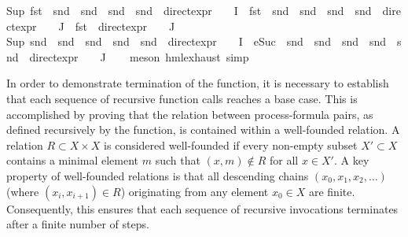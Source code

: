 \begin{isabellebody}
{\isacharparenleft}{\kern0pt}Sup\ {\isacharparenleft}{\kern0pt}{\isacharparenleft}{\kern0pt}fst\ {\isasymcirc}\ snd\ {\isasymcirc}\ snd\ {\isasymcirc}\ snd\ {\isasymcirc}\ snd\ {\isasymcirc}\ direct{\isacharunderscore}{\kern0pt}expr\ {\isasymcirc}\ {\isasymPhi}{\isacharparenright}{\kern0pt}\ {\isacharbackquote}{\kern0pt}\ I\ {\isasymunion}\ {\isacharparenleft}{\kern0pt}fst\ {\isasymcirc}\ snd\ {\isasymcirc}\ snd\ {\isasymcirc}\ snd\ {\isasymcirc}\ snd\ {\isasymcirc}\ direct{\isacharunderscore}{\kern0pt}expr\ {\isasymcirc}\ {\isasymPhi}{\isacharparenright}{\kern0pt}\ {\isacharbackquote}{\kern0pt}\ J\ {\isasymunion}\ {\isacharparenleft}{\kern0pt}fst\ {\isasymcirc}\ direct{\isacharunderscore}{\kern0pt}expr\ {\isasymcirc}\ {\isasymPhi}{\isacharparenright}{\kern0pt}\ {\isacharbackquote}{\kern0pt}\ J{\isacharparenright}{\kern0pt}{\isacharparenright}{\kern0pt}{\isacharcomma}{\kern0pt}\ \isanewline
{\isacharparenleft}{\kern0pt}Sup\ {\isacharparenleft}{\kern0pt}{\isacharparenleft}{\kern0pt}snd\ {\isasymcirc}\ snd\ {\isasymcirc}\ snd\ {\isasymcirc}\ snd\ {\isasymcirc}\ snd\ {\isasymcirc}\ direct{\isacharunderscore}{\kern0pt}expr\ {\isasymcirc}\ {\isasymPhi}{\isacharparenright}{\kern0pt}\ {\isacharbackquote}{\kern0pt}\ I\ {\isasymunion}\ {\isacharparenleft}{\kern0pt}{\isacharparenleft}{\kern0pt}eSuc\ {\isasymcirc}\ snd\ {\isasymcirc}\ snd\ {\isasymcirc}\ snd\ {\isasymcirc}\ snd\ {\isasymcirc}\ snd\ {\isasymcirc}\ direct{\isacharunderscore}{\kern0pt}expr\ {\isasymcirc}\ {\isasymPhi}{\isacharparenright}{\kern0pt}\ {\isacharbackquote}{\kern0pt}\ J{\isacharparenright}{\kern0pt}{\isacharparenright}{\kern0pt}{\isacharparenright}{\kern0pt}{\isacharparenright}{\kern0pt}{\isachardoublequoteclose}\isanewline
%
\isadelimproof
\ \ %
\endisadelimproof
%
\isatagproof
{}\isamarkupfalse%
\ {\isacharparenleft}{\kern0pt}{\isacharparenleft}{\kern0pt}meson\ hml{\isachardot}{\kern0pt}exhaust{\isacharparenright}{\kern0pt}{\isacharcomma}{\kern0pt}\ simp{\isacharplus}{\kern0pt}{\isacharparenright}{\kern0pt}%
\endisatagproof
{\isafoldproof}%
%
\isadelimproof
%
\endisadelimproof
%
\begin{isamarkuptext}%
In order to demonstrate termination of the function, it is necessary to establish that each sequence of recursive function calls reaches a base case. 
This is accomplished by proving that the relation between process-formula pairs, as defined recursively by the function, is contained within a well-founded relation. 
A relation \( R \subset X \times X \) is considered well-founded if every non-empty subset \( X' \subset X \) contains a minimal element \( m \) such that \( (x, m) \notin R \) for all \( x \in X' \). 
A key property of well-founded relations is that all descending chains \( (x_0, x_1, x_2, \ldots) \) (where \( (x_i, x_{i+1}) \in R \)) originating from any element \( x_0 \in X \) are finite. 
Consequently, this ensures that each sequence of recursive invocations terminates after a finite number of steps. 


\end{isamarkuptext}
\end{isabellebody}
